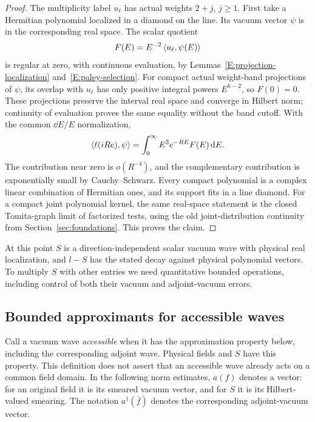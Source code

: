 \begin{proof}
The multiplicity label $u_\ell$ has actual weights $2+j$, $j\geq1$.
First take a Hermitian polynomial localized in a diamond on the line.
Its vacuum vector $\psi$ is in the corresponding real space.  The
scalar quotient
\[
 F(E)=E^{-2}\left\langle u_\ell,\psi(E)\right\rangle
\]
is regular at zero, with continuous evaluation, by
Lemmas~\ref{E:projection-localization} and~\ref{E:paley-selection}.
For compact actual weight-band projections of $\psi$, its overlap with
$u_\ell$ has only positive integral powers $E^{h-2}$, so $F(0)=0$.
These projections preserve the interval real space and converge in
Hilbert norm; continuity of evaluation proves the same equality
without the band cutoff.  With the common $\dd E/E$ normalization,
\[
 \left\langle\ell(iRe),\psi\right\rangle=\int_0^\infty E^3e^{-RE}F(E)\,\mathrm d E.
\]
The contribution near zero is $o(R^{-4})$, and the complementary
contribution is exponentially small by Cauchy--Schwarz.  Every compact
polynomial is a complex linear combination of Hermitian ones, and its
support fits in a line diamond.  For a compact joint polynomial
kernel, the same real-space statement is the closed Tomita-graph
limit of factorized tests, using the old joint-distribution
continuity from Section~\ref{sec:foundations}.  This proves the claim.
\end{proof}

At this point $S$ is a direction-independent scalar vacuum wave
with physical real localization, and $l-S$ has the stated decay against
physical polynomial vectors.  To multiply $S$ with other entries we
need quantitative bounded operations, including control of both their
vacuum and adjoint-vacuum errors.

\subsection{Bounded approximants for accessible waves}

Call a vacuum wave \emph{accessible} when it has the approximation
property below, including the corresponding adjoint wave.  Physical
fields and $S$ have this property.  This definition does not assert
that an accessible wave already acts on a common field domain.
In the following norm estimates, $a(f)$ denotes a vector: for an
original field it is its smeared vacuum vector, and for $S$ it is
its Hilbert-valued smearing.  The notation
$a^\dagger(\bar f)$ denotes the corresponding adjoint-vacuum vector.

